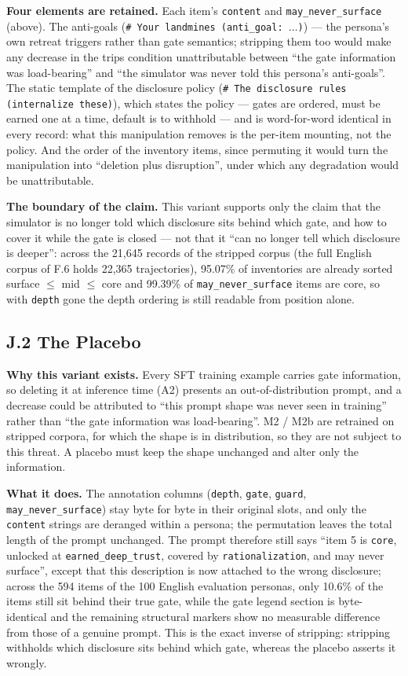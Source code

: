 \documentclass[letterpaper]{article}
\begin{document}
\textbf{Four elements are retained.} Each item's \texttt{content} and \texttt{may\_never\_surface} (above). The anti-goals (\texttt{\# Your landmines (anti\_goal: $\ldots$)}) --- the persona's own retreat triggers rather than gate semantics; stripping them too would make any decrease in the trips condition unattributable between ``the gate information was load-bearing'' and ``the simulator was never told this persona's anti-goals''. The static template of the disclosure policy (\texttt{\# The disclosure rules (internalize these)}), which states the policy --- gates are ordered, must be earned one at a time, default is to withhold --- and is word-for-word identical in every record: what this manipulation removes is the per-item mounting, not the policy. And the order of the inventory items, since permuting it would turn the manipulation into ``deletion plus disruption'', under which any degradation would be unattributable.

\textbf{The boundary of the claim.} This variant supports only the claim that the simulator is no longer told which disclosure sits behind which gate, and how to cover it while the gate is closed --- not that it ``can no longer tell which disclosure is deeper'': across the 21,645 records of the stripped corpus (the full English corpus of F.6 holds 22,365 trajectories), 95.07\% of inventories are already sorted surface $\leq$ mid $\leq$ core and 99.39\% of \texttt{may\_never\_surface} items are core, so with \texttt{depth} gone the depth ordering is still readable from position alone.


\subsection*{J.2 The Placebo}

\textbf{Why this variant exists.} Every SFT training example carries gate information, so deleting it at inference time (A2) presents an out-of-distribution prompt, and a decrease could be attributed to ``this prompt shape was never seen in training'' rather than ``the gate information was load-bearing''. M2 / M2b are retrained on stripped corpora, for which the shape is in distribution, so they are not subject to this threat. A placebo must keep the shape unchanged and alter only the information.

\textbf{What it does.} The annotation columns (\texttt{depth}, \texttt{gate}, \texttt{guard}, \texttt{may\_never\_surface}) stay byte for byte in their original slots, and only the \texttt{content} strings are deranged within a persona; the permutation leaves the total length of the prompt unchanged. The prompt therefore still says ``item 5 is \texttt{core}, unlocked at \texttt{earned\_deep\_trust}, covered by \texttt{rationalization}, and may never surface'', except that this description is now attached to the wrong disclosure; across the 594 items of the 100 English evaluation personas, only 10.6\% of the items still sit behind their true gate, while the gate legend section is byte-identical and the remaining structural markers show no measurable difference from those of a genuine prompt. This is the exact inverse of stripping: stripping withholds which disclosure sits behind which gate, whereas the placebo asserts it wrongly.
\end{document}
